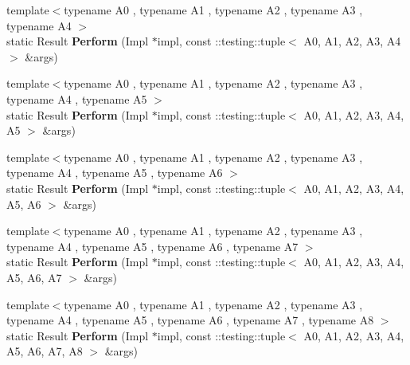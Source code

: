 \begin{DoxyCompactItemize}
\item 
{\footnotesize template$<$typename A0 , typename A1 , typename A2 , typename A3 , typename A4 $>$ }\\static Result {\bfseries Perform} (Impl $\ast$impl, const \+::testing\+::tuple$<$ A0, A1, A2, A3, A4 $>$ \&args)\hypertarget{classtesting_1_1internal_1_1ActionHelper_afd2d1dcea480db63416fc3b8604dec56}{}\label{classtesting_1_1internal_1_1ActionHelper_afd2d1dcea480db63416fc3b8604dec56}

\item 
{\footnotesize template$<$typename A0 , typename A1 , typename A2 , typename A3 , typename A4 , typename A5 $>$ }\\static Result {\bfseries Perform} (Impl $\ast$impl, const \+::testing\+::tuple$<$ A0, A1, A2, A3, A4, A5 $>$ \&args)\hypertarget{classtesting_1_1internal_1_1ActionHelper_a58e3b1699dd3a4404ed2cd652327d8ca}{}\label{classtesting_1_1internal_1_1ActionHelper_a58e3b1699dd3a4404ed2cd652327d8ca}

\item 
{\footnotesize template$<$typename A0 , typename A1 , typename A2 , typename A3 , typename A4 , typename A5 , typename A6 $>$ }\\static Result {\bfseries Perform} (Impl $\ast$impl, const \+::testing\+::tuple$<$ A0, A1, A2, A3, A4, A5, A6 $>$ \&args)\hypertarget{classtesting_1_1internal_1_1ActionHelper_a457f1505b200c5125c3bb370fb7e7bb4}{}\label{classtesting_1_1internal_1_1ActionHelper_a457f1505b200c5125c3bb370fb7e7bb4}

\item 
{\footnotesize template$<$typename A0 , typename A1 , typename A2 , typename A3 , typename A4 , typename A5 , typename A6 , typename A7 $>$ }\\static Result {\bfseries Perform} (Impl $\ast$impl, const \+::testing\+::tuple$<$ A0, A1, A2, A3, A4, A5, A6, A7 $>$ \&args)\hypertarget{classtesting_1_1internal_1_1ActionHelper_a1f851f76793206daf2dd8a2f9621f43c}{}\label{classtesting_1_1internal_1_1ActionHelper_a1f851f76793206daf2dd8a2f9621f43c}

\item 
{\footnotesize template$<$typename A0 , typename A1 , typename A2 , typename A3 , typename A4 , typename A5 , typename A6 , typename A7 , typename A8 $>$ }\\static Result {\bfseries Perform} (Impl $\ast$impl, const \+::testing\+::tuple$<$ A0, A1, A2, A3, A4, A5, A6, A7, A8 $>$ \&args)\hypertarget{classtesting_1_1internal_1_1ActionHelper_afcc265631df5d3a0f8955e9aa35c57f7}{}\label{classtesting_1_1internal_1_1ActionHelper_afcc265631df5d3a0f8955e9aa35c57f7}


\end{DoxyCompactItemize}
